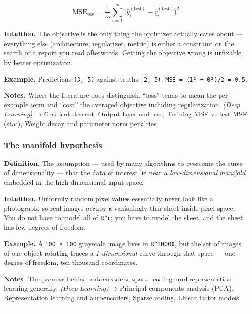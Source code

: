 \documentclass[
  10pt,
  letterpaper,
  onecolumn]{article}
\begin{document}
\begin{equation*}
\mathrm{MSE}_{\text{test}}=\frac{1}{m}\sum_{i=1}^{m}\bigl(\hat y^{(\text{test})}_i-y^{(\text{test})}_i\bigr)^2
\end{equation*}

\textbf{Intuition.} The objective is the only thing the optimizer
actually cares about --- everything else (architecture, regularizer,
metric) is either a constraint on the search or a report you read
afterwards. Getting the objective wrong is unfixable by better
optimization.

\textbf{Example.} Predictions \texttt{(3,\ 5)} against truths
\texttt{(2,\ 5)}: \texttt{MSE\ =\ (1²\ +\ 0²)/2\ =\ 0.5}.

\textbf{Notes.} Where the literature does distinguish, ``loss'' tends to
mean the per-example term and ``cost'' the averaged objective including
regularization. \emph{(Deep Learning)} → Gradient descent, Output layer
and loss, Training MSE vs test MSE (stat), Weight decay and parameter
norm penalties.

\hypertarget{the-manifold-hypothesis}{%
\subsubsection{The manifold
hypothesis}\label{the-manifold-hypothesis}}

\textbf{Definition.} The assumption --- used by many algorithms to
overcome the curse of dimensionality --- that the data of interest lie
near a \emph{low-dimensional manifold} embedded in the high-dimensional
input space.

\textbf{Intuition.} Uniformly random pixel values essentially never look
like a photograph, so real images occupy a vanishingly thin sheet inside
pixel space. You do not have to model all of \texttt{R\^{}n}; you have
to model the sheet, and the sheet has few degrees of freedom.

\textbf{Example.} A \texttt{100\ ×\ 100} grayscale image lives in
\texttt{R\^{}10000}, but the set of images of one object rotating traces
a \emph{1-dimensional} curve through that space --- one degree of
freedom, ten thousand coordinates.

\textbf{Notes.} The premise behind autoencoders, sparse coding, and
representation learning generally. \emph{(Deep Learning)} → Principal
components analysis (PCA), Representation learning and autoencoders,
Sparse coding, Linear factor models.

\begin{center}\rule{0.5\linewidth}{0.5pt}\end{center}
\end{document}
